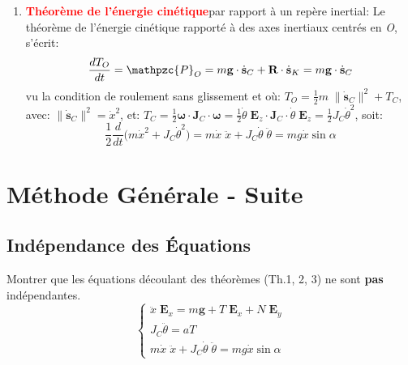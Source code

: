 \documentclass[a4paper]{article}
\begin{document}
\begin{enumerate}
\item \textcolor{red}{\textbf{Théorème de l’énergie cinétique}}\footnotemark[\value{footnote}] par rapport à un repère inertial: Le théorème de l’énergie cinétique rapporté à des axes inertiaux centrés en \emph{O}, s’écrit:
\[ \frac{d T_O}{d t} = \mathpzc{P}_O = m \textbf{g} \cdot \dot{\textbf{s}}_C + \textbf{R} \cdot \dot{\textbf{s}}_K = m \textbf{g} \cdot \dot{\textbf{s}}_C \]
vu la condition de roulement sans glissement et où: $\displaystyle T_O = \frac{1}{2} m \; \| \dot{\textbf{s}}_C \|^2 + T_C $, avec: $ \| \dot{\textbf{s}}_C \|^2 = \dot{x}^2 $, et: $\displaystyle T_C = \frac{1}{2} \boldsymbol{\omega} \cdot \textbf{J}_C \cdot \boldsymbol{\omega} = \frac{1}{2} \dot{\theta} \; \textbf{E}_z \cdot \textbf{J}_C \cdot \dot{\theta} \; \textbf{E}_z = \frac{1}{2} J_C \dot{\theta}^2 $, soit:
\begin{equation}\tag{Th.3}
\frac{1}{2} \frac{d}{d t} \big( m \dot{x}^2 + J_C \dot{\theta}^2 \big) = m \dot{x} \; \ddot{x} + J_C \dot{\theta} \; \ddot{\theta} = m g \dot{x} \sin \alpha
\end{equation}





\end{enumerate}










\section{Méthode Générale - Suite}





\subsection{Indépendance des Équations}





Montrer que les équations découlant des théorèmes (Th.1, 2, 3) ne sont \textbf{pas} indépendantes.
\[ \begin{cases}
\ddot{x} \; \textbf{E}_x = m \textbf{g} + T \; \textbf{E}_x + N \; \textbf{E}_y \\
J_C \ddot{\theta} = a T \\
m \dot{x} \; \ddot{x} + J_C \dot{\theta} \; \ddot{\theta} = m g \dot{x} \sin \alpha
\end{cases} \]
\end{document}
